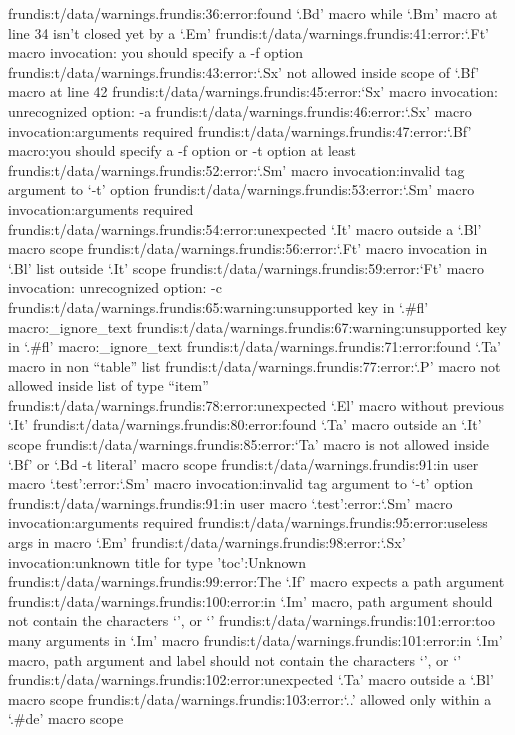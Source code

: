 frundis:t/data/warnings.frundis:36:error:found `.Bd' macro while `.Bm' macro at line 34 isn't closed yet by a `.Em'
frundis:t/data/warnings.frundis:41:error:`.Ft' macro invocation: you should specify a -f option
frundis:t/data/warnings.frundis:43:error:`.Sx' not allowed inside scope of `.Bf' macro at line 42
frundis:t/data/warnings.frundis:45:error:`Sx' macro invocation: unrecognized option: -a
frundis:t/data/warnings.frundis:46:error:`.Sx' macro invocation:arguments required
frundis:t/data/warnings.frundis:47:error:`.Bf' macro:you should specify a -f option or -t option at least
frundis:t/data/warnings.frundis:52:error:`.Sm' macro invocation:invalid tag argument to `-t' option
frundis:t/data/warnings.frundis:53:error:`.Sm' macro invocation:arguments required
frundis:t/data/warnings.frundis:54:error:unexpected `.It' macro outside a `.Bl' macro scope
frundis:t/data/warnings.frundis:56:error:`.Ft' macro invocation in `.Bl' list outside `.It' scope
frundis:t/data/warnings.frundis:59:error:`Ft' macro invocation: unrecognized option: -c
frundis:t/data/warnings.frundis:65:warning:unsupported key in `.#fl' macro:_ignore_text
frundis:t/data/warnings.frundis:67:warning:unsupported key in `.#fl' macro:_ignore_text
frundis:t/data/warnings.frundis:71:error:found `.Ta' macro in non ``table'' list
frundis:t/data/warnings.frundis:77:error:`.P' macro not allowed inside list of type ``item''
frundis:t/data/warnings.frundis:78:error:unexpected `.El' macro without previous `.It'
frundis:t/data/warnings.frundis:80:error:found `.Ta' macro outside an `.It' scope
frundis:t/data/warnings.frundis:85:error:`Ta' macro is not allowed inside `.Bf' or `.Bd -t literal' macro scope
frundis:t/data/warnings.frundis:91:in user macro `.test':error:`.Sm' macro invocation:invalid tag argument to `-t' option
frundis:t/data/warnings.frundis:91:in user macro `.test':error:`.Sm' macro invocation:arguments required
frundis:t/data/warnings.frundis:95:error:useless args in macro `.Em'
frundis:t/data/warnings.frundis:98:error:`.Sx' invocation:unknown title for type 'toc':Unknown
frundis:t/data/warnings.frundis:99:error:The `.If' macro expects a path argument
frundis:t/data/warnings.frundis:100:error:in `.Im' macro, path argument should not contain the characters `{', or `}'
frundis:t/data/warnings.frundis:101:error:too many arguments in `.Im' macro
frundis:t/data/warnings.frundis:101:error:in `.Im' macro, path argument and label should not contain the characters `{', or `}'
frundis:t/data/warnings.frundis:102:error:unexpected `.Ta' macro outside a `.Bl' macro scope
frundis:t/data/warnings.frundis:103:error:`..' allowed only within a `.#de' macro scope
